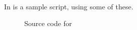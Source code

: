 \noindent
In  is a sample script, using some of these.

\begin{figure}[htpb]
    
    \caption{Source code for }
	\label{fig:tmpdir.sh}
\end{figure}

